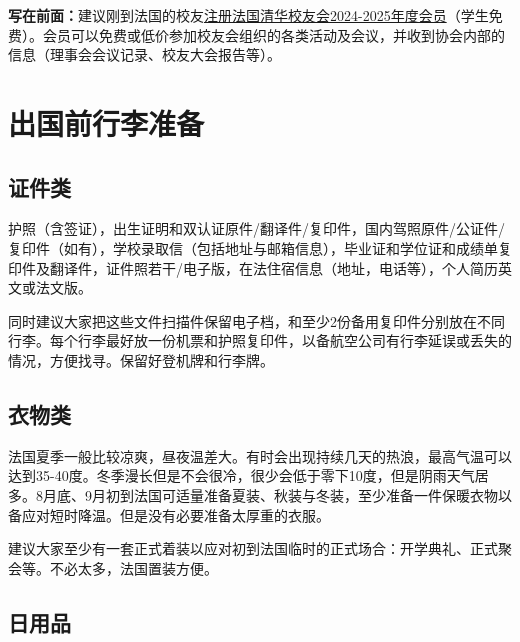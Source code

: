 \documentclass[UTF8]{ctexart}
\begin{document}
\begin{titlepage}
\begin{center}
        \vspace{1 cm} 

        \large{\textbf{写在前面：}建议刚到法国的校友\href{https://www.helloasso.com/associations/association-des-anciens-eleves-de-l-universite-tsi/adhesions/adhesion-2024-2025}{注册法国清华校友会2024-2025年度会员}（学生免费）。会员可以免费或低价参加校友会组织的各类活动及会议，并收到协会内部的信息（理事会会议记录、校友大会报告等）。}
      
    \end{center}
\setcounter{page}{0}
\end{titlepage}

\newpage
\tableofcontents

\fancyfoot[C]{\thepage}

\newpage

\section{出国前行李准备}
\subsection{证件类}
护照（含签证），出生证明和双认证原件/翻译件/复印件，国内驾照原件/公证件/复印件（如有），学校录取信（包括地址与邮箱信息），毕业证和学位证和成绩单复印件及翻译件，证件照若干/电子版，在法住宿信息（地址，电话等），个人简历英文或法文版。

同时建议大家把这些文件扫描件保留电子档，和至少2份备用复印件分别放在不同行李。每个行李最好放一份机票和护照复印件，以备航空公司有行李延误或丢失的情况，方便找寻。保留好登机牌和行李牌。

\subsection{衣物类}

法国夏季一般比较凉爽，昼夜温差大。有时会出现持续几天的热浪，最高气温可以达到35-40度。冬季漫长但是不会很冷，很少会低于零下10度，但是阴雨天气居多。8月底、9月初到法国可适量准备夏装、秋装与冬装，至少准备一件保暖衣物以备应对短时降温。但是没有必要准备太厚重的衣服。

建议大家至少有一套正式着装以应对初到法国临时的正式场合：开学典礼、正式聚会等。不必太多，法国置装方便。

\subsection{日用品}
\end{document}
